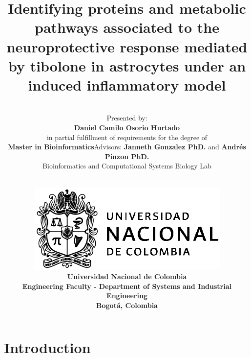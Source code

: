 \documentclass[11pt]{beamer}
\author[Daniel Osorio]{\vspace*{-0.55cm}\\\normalsize{\scriptsize{Presented by:}\\\normalsize{\textbf{Daniel Camilo Osorio Hurtado}}}\\\scriptsize{in partial fulfillment of requirements for the degree of} \normalsize{\\\textbf{Master in Bioinformatics}\newline \newline Advisors: \textbf{Janneth Gonzalez PhD.} and \textbf{Andrés Pinzon PhD.}}\\\scriptsize{Bioinformatics and Computational Systems Biology Lab}}
\title[Bioinformatics Master Thesis]{Identifying proteins and metabolic pathways associated to the neuroprotective response mediated by tibolone in astrocytes under an induced inflammatory model}
\date[]{\scriptsize{\vspace{-1.1cm}\\\includegraphics[scale=.1]{UN}\\\textbf{Universidad Nacional de Colombia\\ Engineering Faculty - Department of Systems and Industrial Engineering\\Bogotá, Colombia}}}
\begin{document}
\maketitle
\section{Introduction}
\end{document}
